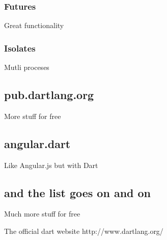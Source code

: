 \documentclass[10pt]{book}
\begin{document}
\subsubsection{Futures}
Great functionality
\subsubsection{Isolates}
Mutli proceses
\subsection{pub.dartlang.org}
More stuff for free
\subsection{angular.dart}
Like Angular.js but with Dart
\subsection{and the list goes on and on}
Much more stuff for free



\backmatter
%
\begin{thebibliography}{99}
The official dart website
http://www.dartlang.org/

\end{thebibliography}
\end{document}
